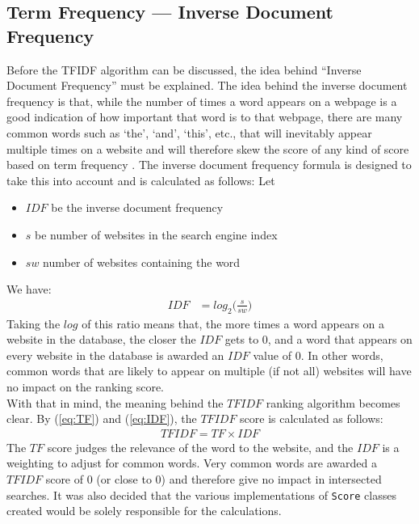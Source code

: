 \subsection{Term Frequency — Inverse Document Frequency}
Before the TFIDF algorithm can be discussed, the idea behind ``Inverse Document Frequency'' must be explained.\newline
The idea behind the inverse document frequency is that, while the number of times a word appears on a webpage is a good indication of how important that word is to that webpage, there are many common words such as `the', `and', `this', etc., that will inevitably appear multiple times on a website and will therefore skew the score of any kind of score based on term frequency \citep{Jones72astatistical}.
The inverse document frequency formula is designed to take this into account and is calculated as follows:\newline
Let
\begin{itemize}
    \item $IDF$ be the inverse document frequency
    \item $s$ be number of websites in the search engine index
    \item $sw$ number of websites containing the word
\end{itemize}
We have:
\begin{align}
    IDF &= log_{2}\bigg(\frac{s}{sw}\bigg)
    \label{eq:IDF}
\end{align}
Taking the $log$ of this ratio means that, the more times a word appears on a website in the database, the closer the $IDF$ gets to $0$, and a word that appears on every website in the database is awarded an $IDF$ value of $0$.
In other words, common words that are likely to appear on multiple (if not all) websites will have no impact on the ranking score.
\\
With that in mind, the meaning behind the $TFIDF$ ranking algorithm becomes clear.
By (\ref{eq:TF}) and (\ref{eq:IDF}), the $TFIDF$ score is calculated as follows:
\begin{align*}
    TFIDF = TF \times IDF
\end{align*}
The $TF$ score judges the relevance of the word to the website, and the $IDF$ is a weighting to adjust for common words. Very common words are awarded a $TFIDF$ score of 0 (or close to 0) and therefore give no impact in intersected searches.\newline
It was also decided that the various implementations of {\tt Score} classes created would be solely responsible for the calculations.

